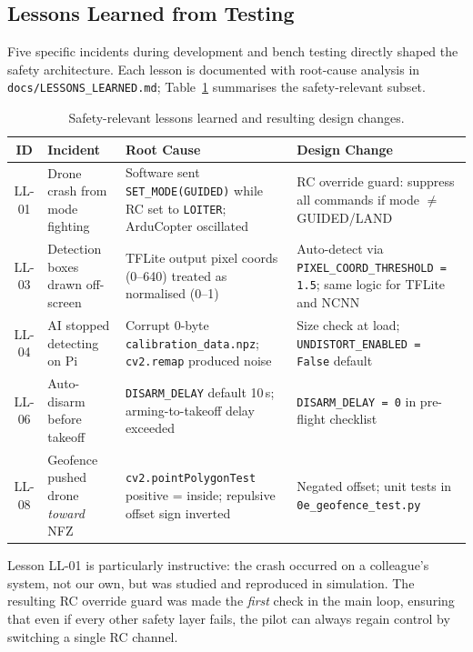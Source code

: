 \subsection{Lessons Learned from Testing}\label{sec:lessons}

Five specific incidents during development and bench testing directly shaped the safety architecture. Each lesson is documented with root-cause analysis in \texttt{docs/LESSONS\_LEARNED.md}; Table~\ref{tab:lessons} summarises the safety-relevant subset.

\begin{table}[htbp]
\centering
\caption{Safety-relevant lessons learned and resulting design changes.}
\label{tab:lessons}
\small
\begin{tabular}{cp{3.8cm}p{4.0cm}p{3.5cm}}
\toprule
\textbf{ID} & \textbf{Incident} & \textbf{Root Cause} & \textbf{Design Change} \\
\midrule
LL-01 & Drone crash from mode fighting & Software sent \texttt{SET\_MODE(GUIDED)} while RC set to \texttt{LOITER}; ArduCopter oscillated & RC override guard: suppress all commands if mode $\neq$ GUIDED/LAND \\
LL-03 & Detection boxes drawn off-screen & TFLite output pixel coords (0--640) treated as normalised (0--1) & Auto-detect via \texttt{PIXEL\_COORD\_THRESHOLD = 1.5}; same logic for TFLite and NCNN \\
LL-04 & AI stopped detecting on Pi & Corrupt 0-byte \texttt{calibration\_data.npz}; \texttt{cv2.remap} produced noise & Size check at load; \texttt{UNDISTORT\_ENABLED = False} default \\
LL-06 & Auto-disarm before takeoff & \texttt{DISARM\_DELAY} default 10\,s; arming-to-takeoff delay exceeded & \texttt{DISARM\_DELAY = 0} in pre-flight checklist \\
LL-08 & Geofence pushed drone \emph{toward} NFZ & \texttt{cv2.pointPolygonTest} positive = inside; repulsive offset sign inverted & Negated offset; unit tests in \texttt{0e\_geofence\_test.py} \\
\bottomrule
\end{tabular}
\end{table}

Lesson LL-01 is particularly instructive: the crash occurred on a colleague's system, not our own, but was studied and reproduced in simulation. The resulting RC override guard was made the \emph{first} check in the main loop, ensuring that even if every other safety layer fails, the pilot can always regain control by switching a single RC channel.


